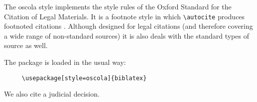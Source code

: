 
\usepackage[style=british]{csquotes}
\usepackage[style=oscola,backend=biber]{biblatex}
\makeatletter\newtoggle{blx@firstinits}\makeatother%


\usepackage[british]{babel}
\renewcommand{\showingstyle}{OSCOLA}
%
The \textsf{oscola} style implements the style rules of the Oxford Standard for the Citation of Legal Materials. It is a footnote style in which  \verb~\autocite~ produces footnoted citations \autocite{worman, reese}. Although designed for legal citations (and therefore covering a wide range of non-standard sources) it is also deals with the standard types of source as well.

\quad The package is loaded in the usual way:
\begin{verbatim}
     \usepackage[style=oscola]{biblatex}
\end{verbatim}

 We also cite a judicial decision.\autocite{donoghue}



